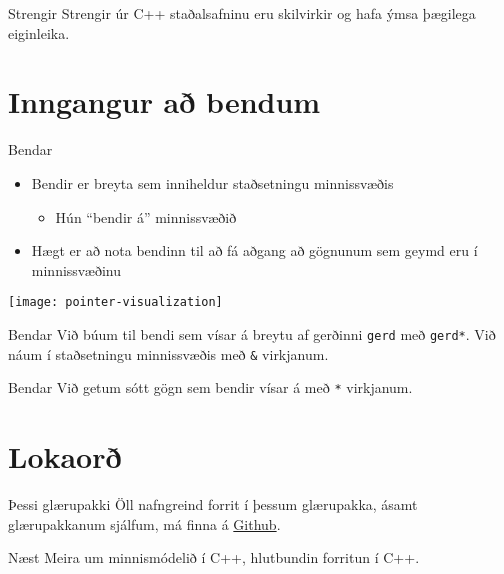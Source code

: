 \documentclass[handout]{beamer}
\begin{document}
\begin{frame}{Strengir}
Strengir úr C++ staðalsafninu eru skilvirkir og hafa ýmsa þægilega eiginleika.


\end{frame}


\section{Inngangur að bendum}

\begin{frame}{Bendar}
\begin{itemize}
 \item Bendir er breyta sem inniheldur staðsetningu minnissvæðis
 \begin{itemize}
  \item Hún ``bendir á'' minnissvæðið
 \end{itemize}
 \item Hægt er að nota bendinn til að fá aðgang að gögnunum sem geymd eru í minnissvæðinu
\end{itemize}
\begin{center}
\texttt{[image: pointer-visualization]}
\end{center}
\end{frame}

\begin{frame}[fragile]{Bendar}
Við búum til bendi sem vísar á breytu af gerðinni \texttt{gerd} með \texttt{gerd*}. Við náum í staðsetningu minnissvæðis með \texttt{\&} virkjanum.
\end{frame}

\begin{frame}[fragile]{Bendar}
Við getum sótt gögn sem bendir vísar á með \texttt{*} virkjanum.
\end{frame}


\section{Lokaorð}

\begin{frame}{Þessi glærupakki}
Öll nafngreind forrit í þessum glærupakka, ásamt glærupakkanum sjálfum, má finna á  \href{https://github.com/Ernir/kennsluefni/tree/master/T2/Code/w1}{Github}.

\end{frame}


\begin{frame}{Næst}
Meira um minnismódelið í C++, hlutbundin forritun í C++.
\end{frame}
\end{document}
